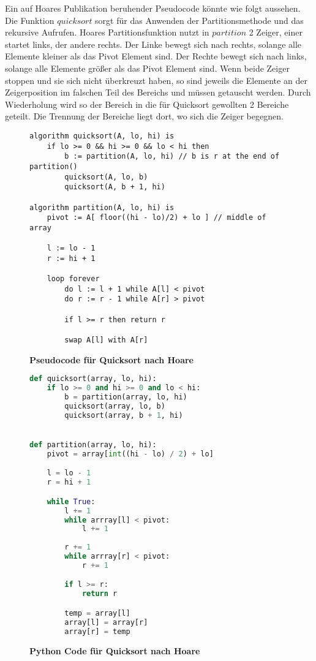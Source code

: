 Ein auf Hoares Publikation beruhender Pseudocode könnte wie folgt aussehen.
Die Funktion $quicksort$ sorgt für das Anwenden der Partitionsmethode und das rekursive
Aufrufen. Hoares Partitionsfunktion nutzt in $partition$ 2 Zeiger, einer startet links,
der andere rechts. Der Linke bewegt sich nach rechts, solange alle Elemente kleiner
als das Pivot Element sind. Der Rechte bewegt sich nach links, solange alle Elemente
größer als das Pivot Element sind. Wenn beide Zeiger stoppen und sie sich nicht überkreuzt
haben, so sind jeweils die Elemente an der Zeigerposition im falschen Teil des Bereichs und
müssen getauscht werden. Durch Wiederholung wird so der Bereich in die für Quicksort gewollten
2 Bereiche geteilt. Die Trennung der Bereiche liegt dort, wo sich die Zeiger begegnen.

\begin{figure}[H]
\begin{lstlisting}
algorithm quicksort(A, lo, hi) is 
    if lo >= 0 && hi >= 0 && lo < hi then
        b := partition(A, lo, hi) // b is r at the end of partition()
        quicksort(A, lo, b)
        quicksort(A, b + 1, hi) 

algorithm partition(A, lo, hi) is 
    pivot := A[ floor((hi - lo)/2) + lo ] // middle of array

    l := lo - 1
    r := hi + 1

    loop forever 
        do l := l + 1 while A[l] < pivot
        do r := r - 1 while A[r] > pivot

        if l >= r then return r

        swap A[l] with A[r]
\end{lstlisting}
\caption{\textbf{Pseudocode für Quicksort nach Hoare}}
\end{figure}

\begin{figure}[H]
\begin{lstlisting}[language=python]
def quicksort(array, lo, hi):
    if lo >= 0 and hi >= 0 and lo < hi:
        b = partition(array, lo, hi)
        quicksort(array, lo, b)
        quicksort(array, b + 1, hi)


def partition(array, lo, hi):
    pivot = array[int((hi - lo) / 2) + lo]

    l = lo - 1
    r = hi + 1

    while True:
        l += 1
        while arrray[l] < pivot:
            l += 1
        
        r += 1
        while arrray[r] < pivot:
            r += 1

        if l >= r:
            return r

        temp = array[l]
        array[l] = array[r]
        array[r] = temp
\end{lstlisting}
\caption{\textbf{Python Code für Quicksort nach Hoare}}
\end{figure}

